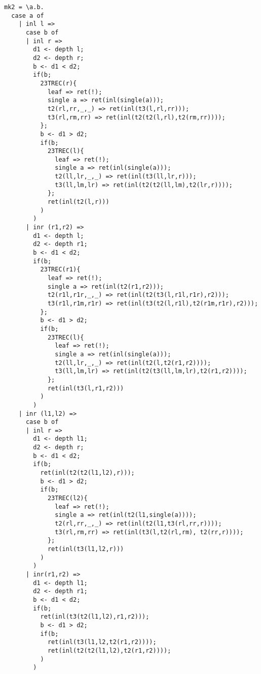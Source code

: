 \begin{itemize}
\begin{verbatim}
mk2 = \a.b. 
  case a of
    | inl l =>
      case b of
      | inl r =>
        d1 <- depth l;
        d2 <- depth r;
        b <- d1 < d2;
        if(b;
          23TREC(r){
            leaf => ret(!);
            single a => ret(inl(single(a)));
            t2(rl,rr,_,_) => ret(inl(t3(l,rl,rr)));
            t3(rl,rm,rr) => ret(inl(t2(t2(l,rl),t2(rm,rr))));
          };
          b <- d1 > d2;
          if(b;
            23TREC(l){
              leaf => ret(!);
              single a => ret(inl(single(a)));
              t2(ll,lr,_,_) => ret(inl(t3(ll,lr,r)));
              t3(ll,lm,lr) => ret(inl(t2(t2(ll,lm),t2(lr,r))));
            };
            ret(inl(t2(l,r)))
          )
        )
      | inr (r1,r2) => 
        d1 <- depth l;
        d2 <- depth r1;
        b <- d1 < d2;
        if(b;
          23TREC(r1){
            leaf => ret(!);
            single a => ret(inl(t2(r1,r2)));
            t2(r1l,r1r,_,_) => ret(inl(t2(t3(l,r1l,r1r),r2)));
            t3(r1l,r1m,r1r) => ret(inl(t3(t2(l,r1l),t2(r1m,r1r),r2)));
          };
          b <- d1 > d2;
          if(b;
            23TREC(l){
              leaf => ret(!);
              single a => ret(inl(single(a)));
              t2(ll,lr,_,_) => ret(inl(t2(l,t2(r1,r2))));
              t3(ll,lm,lr) => ret(inl(t2(t3(ll,lm,lr),t2(r1,r2))));
            };
            ret(inl(t3(l,r1,r2)))
          )
        )
    | inr (l1,l2) => 
      case b of
      | inl r =>
        d1 <- depth l1;
        d2 <- depth r;
        b <- d1 < d2;
        if(b;
          ret(inl(t2(t2(l1,l2),r)));
          b <- d1 > d2;
          if(b;
            23TREC(l2){
              leaf => ret(!);
              single a => ret(inl(t2(l1,single(a))));
              t2(rl,rr,_,_) => ret(inl(t2(l1,t3(rl,rr,r))));
              t3(rl,rm,rr) => ret(inl(t3(l,t2(rl,rm), t2(rr,r))));
            };
            ret(inl(t3(l1,l2,r)))
          )
        )
      | inr(r1,r2) => 
        d1 <- depth l1;
        d2 <- depth r1;
        b <- d1 < d2;
        if(b;
          ret(inl(t3(t2(l1,l2),r1,r2)));
          b <- d1 > d2;
          if(b;
            ret(inl(t3(l1,l2,t2(r1,r2))));
            ret(inl(t2(t2(l1,l2),t2(r1,r2))));
          )
        )


\end{verbatim}
\end{itemize}
